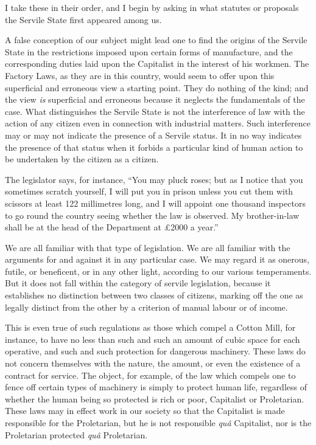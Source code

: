 \documentclass{book}
\begin{document}
I take these in their order, and I begin by asking in what statutes or proposals the Servile State first appeared among us.

A false conception of our subject might lead one to find the origins of the Servile State in the restrictions imposed upon certain forms of manufacture, and the corresponding duties laid upon the Capitalist in the interest of his workmen. The Factory Laws, as they are in this country, would seem to offer upon this superficial and erroneous view a starting point. They do nothing of the kind; and the view \emph{is} superficial and erroneous because it neglects the fundamentals of the case. What distinguishes the Servile State is not the interference of law with the action of any citizen even in connection with industrial matters. Such interference may or may not indicate the presence of a Servile status. It in no way indicates the presence of that status when it forbids a particular kind of human action to be undertaken by the citizen as a citizen.

The legislator says, for instance, “You may pluck roses; but as I notice that you sometimes scratch yourself, I will put you in prison unless you cut them with scissors at least 122 millimetres long, and I will appoint one thousand inspectors to go round the country seeing whether the law is observed. My brother-in-law shall be at the head of the Department at £2000 a year.”

We are all familiar with that type of legislation. We are all familiar with the arguments for and against it in any particular case. We may regard it as onerous, futile, or beneficent, or in any other light, according to our various temperaments. But it does not fall within the category of servile legislation, because it establishes no distinction between two classes of citizens, marking off the one as legally distinct from the other by a criterion of manual labour or of income.

This is even true of such regulations as those which compel a Cotton Mill, for instance, to have no less than such and such an amount of cubic space for each operative, and such and such protection for dangerous machinery. These laws do not concern themselves with the nature, the amount, or even the existence of a contract for service. The object, for example, of the law which compels one to fence off certain types of machinery is simply to protect human life, regardless of whether the human being so protected is rich or poor, Capitalist or Proletarian. These laws may in effect work in our society so that the Capitalist is made responsible for the Proletarian, but he is not responsible \emph{quâ} Capitalist, nor is the Proletarian protected \emph{quâ} Proletarian.
\end{document}

